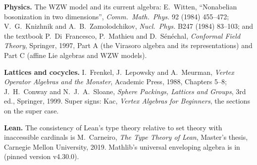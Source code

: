 \textbf{Physics.} The WZW model and its current algebra: E.~Witten, ``Nonabelian bosonization in two
dimensions'', \emph{Comm.\ Math.\ Phys.} 92 (1984) 455--472; V.~G.~Knizhnik and A.~B.~Zamolodchikov,
\emph{Nucl.\ Phys.} B247 (1984) 83--103; and the textbook P.~Di~Francesco, P.~Mathieu and
D.~S\'en\'echal, \emph{Conformal Field Theory}, Springer, 1997, Part A (the Virasoro algebra and its
representations) and Part C (affine Lie algebras and WZW models).

\textbf{Lattices and cocycles.} I.~Frenkel, J.~Lepowsky and A.~Meurman, \emph{Vertex Operator Algebras
and the Monster}, Academic Press, 1988, Chapters 5--8; J.~H.~Conway and N.~J.~A.~Sloane, \emph{Sphere
Packings, Lattices and Groups}, 3rd ed., Springer, 1999. Super signs: Kac, \emph{Vertex Algebras for
Beginners}, the sections on the super case.

\textbf{Lean.} The consistency of Lean's type theory relative to set theory with inaccessible cardinals is
M.~Carneiro, \emph{The Type Theory of Lean}, Master's thesis, Carnegie Mellon University, 2019. Mathlib's
universal enveloping algebra is in 
(pinned version v4.30.0).

\endgroup
